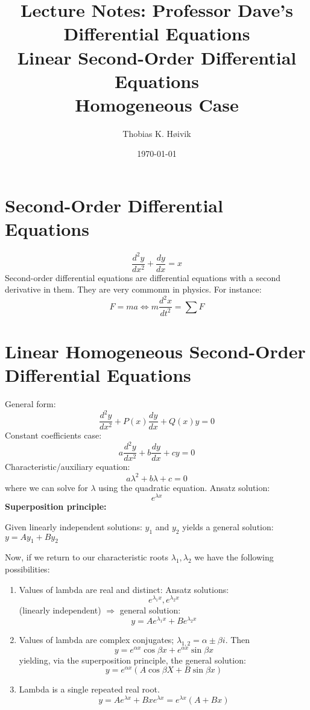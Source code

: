 \documentclass[12pt]{article}
\title{Lecture Notes: Professor Dave's Differential Equations \\ Linear Second-Order Differential Equations \\ Homogeneous Case}
\author{Thobias K. Høivik}
\date{\today}
\begin{document}
\maketitle
\section*{Second-Order Differential Equations}
\[ 
    \frac{d^2y}{dx^2} + \frac{dy}{dx} = x 
\]
Second-order differential equations are differential equations with a second derivative 
in them. They are very commonm in physics. For instance: 
\[ 
    F = ma \Leftrightarrow m\frac{d^2x}{dt^2} = \displaystyle\sum F
\]

\section*{Linear Homogeneous Second-Order Differential Equations}
General form: 
\[ 
    \frac{d^2y}{dx^2} + P(x)\frac{dy}{dx} + Q(x)y = 0
\]
Constant coefficients case: 
\[ 
    a\frac{d^2y}{dx^2} + b\frac{dy}{dx} + cy = 0
\]
Characteristic/auxiliary equation: 
\[ 
    a\lambda^2 + b\lambda + c = 0
\]
where we can solve for \(\lambda\) using the quadratic equation.
Ansatz solution: 
\[ 
    e^{\lambda x}
\]
\noindent 
\textbf{Superposition principle: }

\noindent 
Given linearly independent solutions: \(y_ 1\) and \(y_2\) 
yields a general solution: \(y = Ay_1 + By_2\)

\noindent 
Now, if we return to our characteristic roots \(\lambda_1, \lambda_2\) we have the following
possibilities: 
\begin{enumerate}
    \item Values of lambda are real and distinct:
        \noindent 
        Ansatz solutions: \[e^{\lambda_1 x}, e^{\lambda_2 x}\] (linearly independent)
        \(\Rightarrow\) general solution: \[y = Ae^{\lambda_1x} + Be^{\lambda_2x}\]

    \item Values of lambda are complex conjugates; \(\lambda_{1,2} = \alpha \pm \beta i\). 
        Then 
        \[ 
            y = e^{\alpha x}\cos\beta x + e^{\alpha x}\sin \beta x
        \]
        yielding, via the superposition principle, the general solution: 
        \[ 
            y = e^{\alpha x}(A\cos \beta X + B \sin \beta x)
        \]

    \item Lambda is a single repeated real root. 
        \[ 
            y = Ae^{\lambda x} + B x e^{\lambda x} = e^{\lambda x} (A + Bx)
        \]
\end{enumerate}
\end{document}
